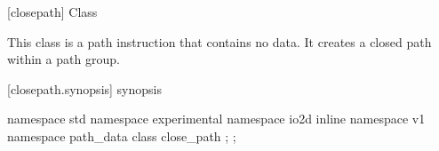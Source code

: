 [closepath] {Class }

\pnum
{}
This class is a path instruction that contains no data. It creates a closed path within a path group.

 [closepath.synopsis] { synopsis}

\begin{codeblock}
namespace std { namespace experimental { namespace io2d { inline namespace v1 {
  namespace path_data {
    class close_path {
    };
};
} } } }
\end{codeblock}

